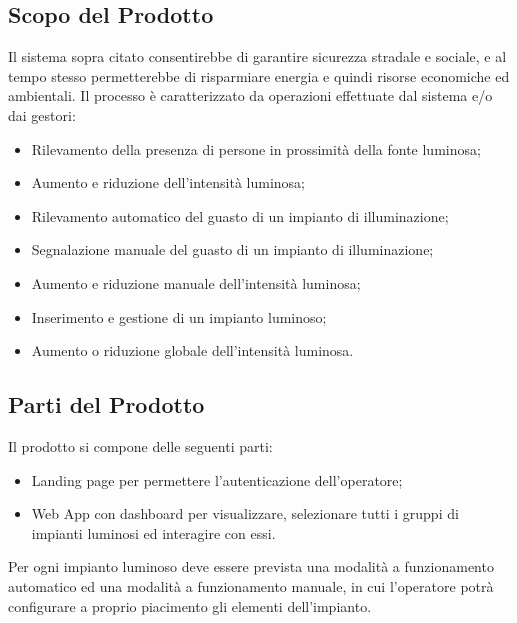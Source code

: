 \documentclass[a4paper, 12pt]{article}
\begin{document}
\subsection{Scopo del Prodotto}
Il sistema sopra citato consentirebbe di garantire sicurezza stradale e sociale, e al tempo stesso permetterebbe di risparmiare energia e quindi risorse economiche ed ambientali. Il processo è caratterizzato da operazioni effettuate dal sistema e/o dai gestori:
\begin{itemize}
    \item Rilevamento della presenza di persone in prossimità della fonte luminosa;
    \item Aumento e riduzione dell'intensità luminosa;
    \item Rilevamento automatico del guasto di un impianto di illuminazione;
    \item Segnalazione manuale del guasto di un impianto di illuminazione;
    \item Aumento e riduzione manuale dell'intensità luminosa;
    \item Inserimento e gestione di un impianto luminoso;
    \item Aumento o riduzione globale dell'intensità luminosa. 
\end{itemize}

\subsection{Parti del Prodotto}
Il prodotto si compone delle seguenti parti: %
\begin{itemize}
    \item Landing page per permettere l'autenticazione dell'operatore;
    \item Web App con dashboard per visualizzare, selezionare tutti i gruppi di
    impianti luminosi ed interagire con essi.
\end{itemize}
Per ogni impianto luminoso deve essere prevista una modalità a funzionamento
automatico ed una modalità a funzionamento manuale, in cui l'operatore potrà
configurare a proprio piacimento gli elementi dell'impianto. 
\end{document}
